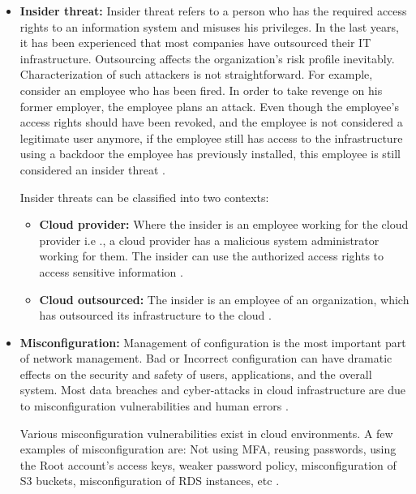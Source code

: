 \begin{itemize}
    \item \textbf{Insider threat:} Insider threat refers to a person who has the required access rights to an
    information system and misuses his privileges.
    In the last years, it has been experienced that most companies have outsourced their IT infrastructure.
    Outsourcing affects the organization’s risk profile inevitably.
    Characterization of such attackers is not straightforward.
    For example, consider an employee who has been fired.
    In order to take revenge on his former employer, the
    employee plans an attack.
    Even though the employee's access rights should have been revoked, and the employee is not considered a
    legitimate user anymore, if the employee still has
    access to the infrastructure using a backdoor the employee has previously installed, this employee is still considered an insider threat \cite{56}.

    Insider threats can be classified into two contexts:
    \begin{itemize}
        \item \textbf{Cloud provider:} Where the insider
        is an employee working for the cloud provider i.e
        ., a cloud provider has a malicious system
        administrator working for them.
        The insider can use the authorized access
        rights to access sensitive information \cite{56}.
    \end{itemize}
    \begin{itemize}
        \item \textbf{Cloud outsourced:} The insider is an employee of an organization, which has outsourced its
        infrastructure to the cloud \cite{56}.
    \end{itemize}
\end{itemize}

\begin{itemize}
    \item \textbf{Misconfiguration:} Management of configuration is the most important part of network management.
    Bad or Incorrect configuration can have dramatic effects on the security and safety of users, applications, and the overall system. Most data breaches and cyber-attacks in cloud infrastructure are due to misconfiguration vulnerabilities and human errors \cite{44}.

    Various misconfiguration vulnerabilities exist in cloud environments.
    A few examples of misconfiguration are: Not
    using MFA, reusing passwords, using the Root account’s access keys, weaker password policy, misconfiguration of S3
    buckets,  misconfiguration of RDS
    instances, etc \cite{55}.
\end{itemize}

